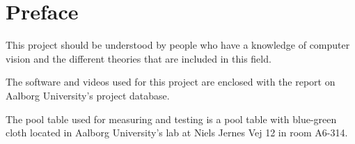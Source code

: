 \section*{Preface}
This project should be understood by people who have a knowledge of computer vision and the different theories that are included in this field.

The software and videos used for this project are enclosed with the report on Aalborg University's project database.

The pool table used for measuring and testing is a pool table with blue-green cloth located in Aalborg University's lab at Niels Jernes Vej 12 in room A6-314.

